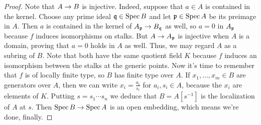 \documentclass[a4paper,parskip=half,numbers=enddot, DIV=12]{scrreprt}
\begin{document}
\begin{proof}
	Note that $A\morphism B$ is injective. Indeed, suppose that $a\in A$ is contained in the kernel. Choose any prime ideal $\mathfrak{q}\in\operatorname{Spec} B$ and let $\mathfrak{p}\in\operatorname{Spec} A$ be its preimage in $A$. Then $a$ is contained in the kernel of $A_\pp\morphism B_\qq$ as well, so $a=0$ in $A_{\mathfrak{p}}$ because $f$ induces isomorphisms on stalks. But $A\morphism A_\pp$ is injective when $A$ is a domain, proving that $a=0$ holds in $A$ as well. Thus, we may regard $A$ as a subring of $B$. Note that both have the same quotient field $K$ because $f$ induces an isomorphism between the stalks at the generic points. Now it's time to remember that $f$ is of locally finite type, so $B$ has finite type over $A$. If $x_1,\ldots,x_m\in B$ are generators over $A$, then we can write $x_i=\frac{a_i}{s_i}$ for $a_i,s_i\in A$, because the $x_i$ are elements of $K$. Putting $s=s_1\cdots s_n$ we deduce that $B=A[s^{-1}]$ is the localization of $A$ at $s$. Then $\Spec B\morphism\Spec A$ is an open embedding, which means we're done, finally.
\end{proof}
\end{document}
